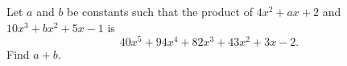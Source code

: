 Let $a$ and $b$ be constants such that the product of $4x^2+ax+2$ and $10x^3+bx^2+5x-1$ is
\[40x^5+94x^4+82x^3+43x^2+3x-2 .\]
Find $a+b$.
